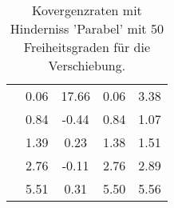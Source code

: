 \begin{table}
\begin{tabular}{c|cc|cc|}
\multicolumn{1}{|c|}{} & \multicolumn{1}{|c|}{      0.06} & \multicolumn{1}{|c|}{     17.66} & \multicolumn{1}{|c|}{      0.06} & \multicolumn{1}{|c|}{      3.38} \\ 
\multicolumn{1}{|c|}{} & \multicolumn{1}{|c|}{      0.84} & \multicolumn{1}{|c|}{     -0.44} & \multicolumn{1}{|c|}{      0.84} & \multicolumn{1}{|c|}{      1.07} \\ 
\multicolumn{1}{|c|}{} & \multicolumn{1}{|c|}{      1.39} & \multicolumn{1}{|c|}{      0.23} & \multicolumn{1}{|c|}{      1.38} & \multicolumn{1}{|c|}{      1.51} \\ 
\multicolumn{1}{|c|}{} & \multicolumn{1}{|c|}{      2.76} & \multicolumn{1}{|c|}{     -0.11} & \multicolumn{1}{|c|}{      2.76} & \multicolumn{1}{|c|}{      2.89} \\ 
\multicolumn{1}{|c|}{} & \multicolumn{1}{|c|}{      5.51} & \multicolumn{1}{|c|}{      0.31} & \multicolumn{1}{|c|}{      5.50} & \multicolumn{1}{|c|}{      5.56} \\ 
\hline 
\end{tabular}\caption{Kovergenzraten mit Hinderniss 'Parabel' mit 50 Freiheitsgraden für die Verschiebung.}\label{tab:Rate_Parabel_level1}
\end{table} 
